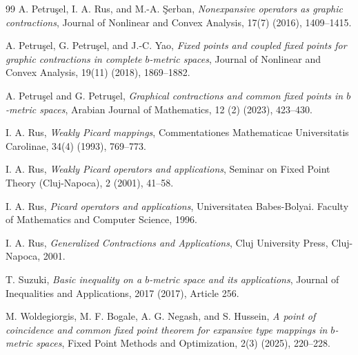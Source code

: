 \documentclass[a4paper,12pt,oneside]{article}
\numberwithin{equation}{section}
\begin{document}
\begin{thebibliography}{99}
A. Petruşel, I. A. Rus, and M.-A. Şerban, \textit{Nonexpansive operators as graphic contractions}, Journal of Nonlinear and Convex Analysis, 17(7) (2016), 1409--1415.

A. Petruşel, G. Petruşel, and J.-C. Yao, \textit{Fixed points and coupled fixed points for graphic contractions in complete $b$-metric spaces}, Journal of Nonlinear and Convex Analysis, 19(11) (2018), 1869--1882.

A. Petruşel and G. Petruşel, \textit{Graphical contractions and common fixed points in $b$-metric spaces}, Arabian Journal of Mathematics, 12 (2) (2023), 423--430.


I. A. Rus, \textit{Weakly Picard mappings}, Commentationes Mathematicae Universitatis Carolinae, 34(4) (1993), 769--773.

    I. A. Rus, \textit{Weakly Picard operators and applications}, Seminar on Fixed Point Theory (Cluj-Napoca), 2 (2001), 41--58.

I. A. Rus, \textit{Picard operators and applications}, Universitatea Babes-Bolyai. Faculty of Mathematics and Computer Science, 1996.

I. A. Rus, \textit{Generalized Contractions and Applications}, Cluj University Press, Cluj-Napoca, 2001.

T. Suzuki, \textit{Basic inequality on a $b$-metric space and its applications}, Journal of Inequalities and Applications, 2017 (2017), Article 256.

M. Woldegiorgis, M. F. Bogale, A. G. Negash, and S. Hussein, \textit{A point of coincidence and common fixed point theorem for expansive type mappings in $b$-metric spaces}, Fixed Point Methods and Optimization, 2(3) (2025), 220--228.

\end{thebibliography}
\end{document}
